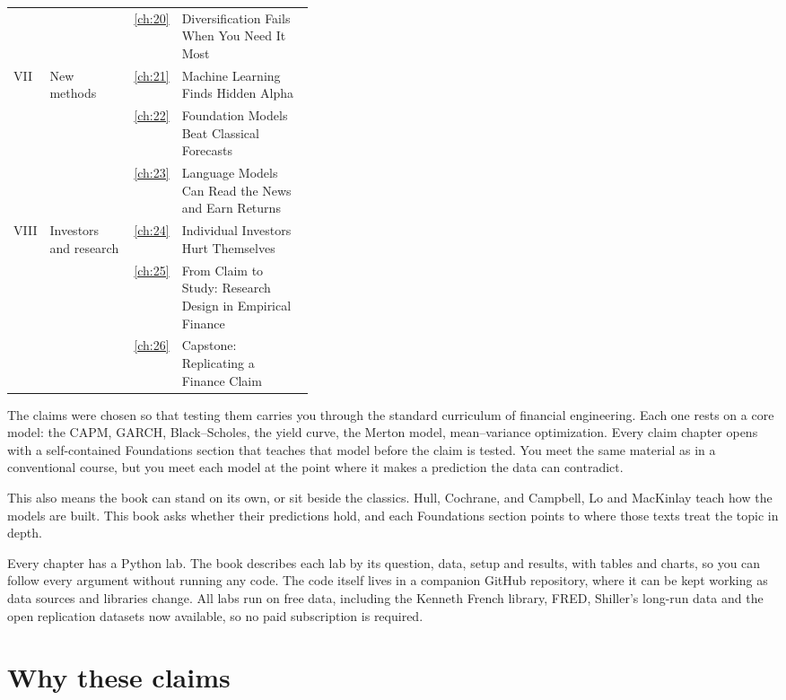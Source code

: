 \begin{table}[htbp]
\begin{tabularx}{0.95\linewidth}{@{}>{\raggedright\arraybackslash}p{0.07\linewidth}>{\raggedright\arraybackslash}p{0.28\linewidth}>{\raggedleft\arraybackslash}p{0.04\linewidth}>{\raggedright\arraybackslash}X@{}}
 &  & \ref{ch:20} & Diversification Fails When You Need It Most \\
\addlinespace
VII & New methods & \ref{ch:21} & Machine Learning Finds Hidden Alpha \\
 &  & \ref{ch:22} & Foundation Models Beat Classical Forecasts \\
 &  & \ref{ch:23} & Language Models Can Read the News and Earn Returns \\
\addlinespace
VIII & Investors and research & \ref{ch:24} & Individual Investors Hurt Themselves \\
 &  & \ref{ch:25} & From Claim to Study: Research Design in Empirical Finance \\
 &  & \ref{ch:26} & Capstone: Replicating a Finance Claim \\
\bottomrule
\end{tabularx}
\end{table}


The claims were chosen so that testing them carries you through the standard curriculum of financial engineering. Each one rests on a core model: the CAPM, GARCH, Black--Scholes, the yield curve, the Merton model, mean--variance optimization. Every claim chapter opens with a self-contained Foundations section that teaches that model before the claim is tested. You meet the same material as in a conventional course, but you meet each model at the point where it makes a prediction the data can contradict.

This also means the book can stand on its own, or sit beside the classics. Hull, Cochrane, and Campbell, Lo and MacKinlay teach how the models are built. This book asks whether their predictions hold, and each Foundations section points to where those texts treat the topic in depth.

Every chapter has a Python lab. The book describes each lab by its question, data, setup and results, with tables and charts, so you can follow every argument without running any code. The code itself lives in a companion GitHub repository, where it can be kept working as data sources and libraries change. All labs run on free data, including the Kenneth French library, FRED, Shiller's long-run data and the open replication datasets now available, so no paid subscription is required.

\section*{Why these claims}

